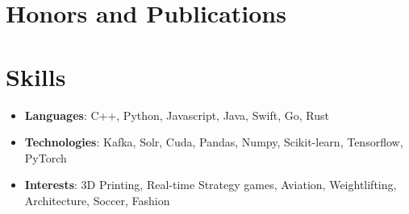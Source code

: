 \documentclass[letterpaper,11pt]{article}
\newcommand{\resumeItem}[2]{
  \item\small{
    \textbf{#1}{: #2\vspace{-2pt}}
  }
}
\newcommand{\resumeSubItem}[2]{\resumeItem{#1}{#2}\vspace{-3.8pt}}
\newcommand{\resumeSubHeadingListStart}{\begin{itemize}[leftmargin=*]}
\newcommand{\resumeSubHeadingListEnd}{\end{itemize}}
\begin{document}
%

\section{Honors and Publications}
  \resumeSubHeadingListStart
  \iftoggle{Finance}{
    \resumeSubItem{MIT IEEE}{Paper on detecting Parkinson's diseases using handwriting samples and recurrent neural networks}
    \resumeSubItem{IOI}{Qualified for Indian National Olympiad in Informatics: programming contest for selecting India's IOI team}
    \resumeSubItem{Jane Street SEE}{Among 32 students selected nationally for quant education program, played electronic trading games, attended lectures on Bayesian thinking, market-making, arbitrage, biases}
    \resumeSubItem{D.E. Shaw Nexus Fellowship}{Selected for sophomore fellowship program of about 30 students nationally}
    \resumeSubItem{Natural Sciences Waiver}{highly competitive scholarship awarded to $<$10 students out of 12,000 undergraduates}
    \resumeSubItem{ASES Stanford}{Winner, Enterpreneurship summit organized by ASES Stanford University}
  }{
    \resumeSubItem{D.E. Shaw Nexus Fellowship}{Selected for sophomore fellowship program of about 30 students nationally}
    \resumeSubItem{IOI}{Qualified for Indian National Olympiad in Informatics: programming contest for selecting India's IOI team}
    \resumeSubItem{MIT IEEE}{Paper on detecting Parkinson's diseases using handwriting samples and recurrent neural networks}
    \resumeSubItem{ASES Stanford}{Winner, Enterpreneurship summit organized by ASES Stanford University}
    \resumeSubItem{Natural Sciences Waiver}{highly competitive scholarship awarded to $<$10 students out of 12,000 undergraduates}
  }
  \resumeSubHeadingListEnd


\section{Skills}
 \resumeSubHeadingListStart
  \resumeSubItem{Languages}{C++, Python, Javascript, Java, Swift, Go, Rust}
  \resumeSubItem{Technologies}{Kafka, Solr, Cuda, Pandas, Numpy, Scikit-learn, Tensorflow, PyTorch}
  \resumeSubItem{Interests}{3D Printing, Real-time Strategy games, Aviation, Weightlifting, Architecture, Soccer, Fashion}
 \resumeSubHeadingListEnd


\end{document}
